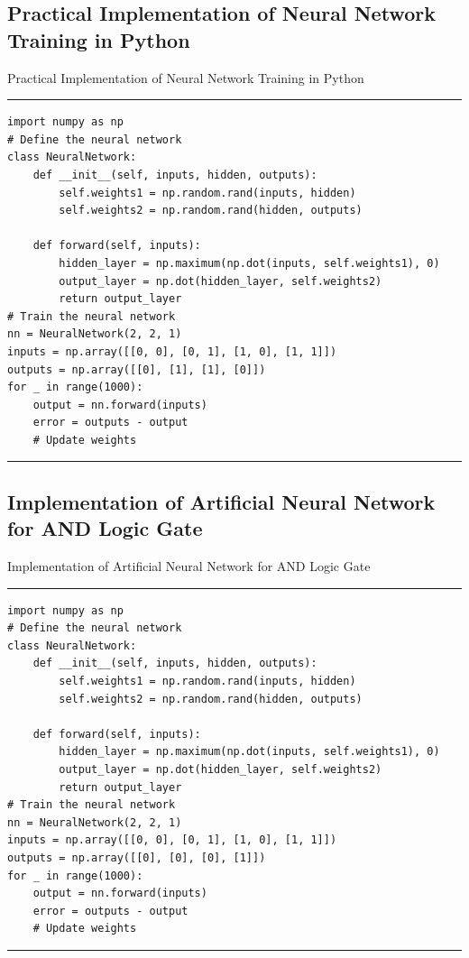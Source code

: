 \documentclass[aspectratio=169, hideothersubsections]{beamer}
\begin{document}
\subsection{Practical Implementation of Neural Network Training in Python}
\begin{frame}[fragile]{Practical Implementation of Neural Network Training in Python}
\rule{\textwidth}{1pt}
\scriptsize
\begin{verbatim}
import numpy as np
# Define the neural network
class NeuralNetwork:
    def __init__(self, inputs, hidden, outputs):
        self.weights1 = np.random.rand(inputs, hidden)
        self.weights2 = np.random.rand(hidden, outputs)

    def forward(self, inputs):
        hidden_layer = np.maximum(np.dot(inputs, self.weights1), 0)
        output_layer = np.dot(hidden_layer, self.weights2)
        return output_layer
# Train the neural network
nn = NeuralNetwork(2, 2, 1)
inputs = np.array([[0, 0], [0, 1], [1, 0], [1, 1]])
outputs = np.array([[0], [1], [1], [0]])
for _ in range(1000):
    output = nn.forward(inputs)
    error = outputs - output
    # Update weights
\end{verbatim}
\rule{\textwidth}{1pt}
\end{frame}

\subsection{Implementation of Artificial Neural Network for AND Logic Gate}
\begin{frame}[fragile]{Implementation of Artificial Neural Network for AND Logic Gate}
\rule{\textwidth}{1pt}
\scriptsize
\begin{verbatim}
import numpy as np
# Define the neural network
class NeuralNetwork:
    def __init__(self, inputs, hidden, outputs):
        self.weights1 = np.random.rand(inputs, hidden)
        self.weights2 = np.random.rand(hidden, outputs)

    def forward(self, inputs):
        hidden_layer = np.maximum(np.dot(inputs, self.weights1), 0)
        output_layer = np.dot(hidden_layer, self.weights2)
        return output_layer
# Train the neural network
nn = NeuralNetwork(2, 2, 1)
inputs = np.array([[0, 0], [0, 1], [1, 0], [1, 1]])
outputs = np.array([[0], [0], [0], [1]])
for _ in range(1000):
    output = nn.forward(inputs)
    error = outputs - output
    # Update weights
\end{verbatim}
\rule{\textwidth}{1pt}
\end{frame}
\end{document}
